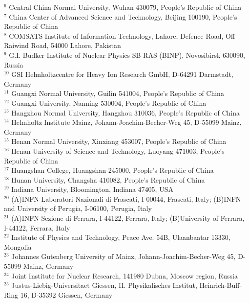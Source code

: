 \begin{small}
\begin{center}
{$^{6}$ Central China Normal University, Wuhan 430079, People's Republic of China\\
$^{7}$ China Center of Advanced Science and Technology, Beijing 100190, People's Republic of China\\
$^{8}$ COMSATS Institute of Information Technology, Lahore, Defence Road, Off Raiwind Road, 54000 Lahore, Pakistan\\
$^{9}$ G.I. Budker Institute of Nuclear Physics SB RAS (BINP), Novosibirsk 630090, Russia\\
$^{10}$ GSI Helmholtzcentre for Heavy Ion Research GmbH, D-64291 Darmstadt, Germany\\
$^{11}$ Guangxi Normal University, Guilin 541004, People's Republic of China\\
$^{12}$ Guangxi University, Nanning 530004, People's Republic of China\\
$^{13}$ Hangzhou Normal University, Hangzhou 310036, People's Republic of China\\
$^{14}$ Helmholtz Institute Mainz, Johann-Joachim-Becher-Weg 45, D-55099 Mainz, Germany\\
$^{15}$ Henan Normal University, Xinxiang 453007, People's Republic of China\\
$^{16}$ Henan University of Science and Technology, Luoyang 471003, People's Republic of China\\
$^{17}$ Huangshan College, Huangshan 245000, People's Republic of China\\
$^{18}$ Hunan University, Changsha 410082, People's Republic of China\\
$^{19}$ Indiana University, Bloomington, Indiana 47405, USA\\
$^{20}$ (A)INFN Laboratori Nazionali di Frascati, I-00044, Frascati, Italy; (B)INFN and University of Perugia, I-06100, Perugia, Italy\\
$^{21}$ (A)INFN Sezione di Ferrara, I-44122, Ferrara, Italy; (B)University of Ferrara, I-44122, Ferrara, Italy\\
$^{22}$ Institute of Physics and Technology, Peace Ave. 54B, Ulaanbaatar 13330, Mongolia\\
$^{23}$ Johannes Gutenberg University of Mainz, Johann-Joachim-Becher-Weg 45, D-55099 Mainz, Germany\\
$^{24}$ Joint Institute for Nuclear Research, 141980 Dubna, Moscow region, Russia\\
$^{25}$ Justus-Liebig-Universitaet Giessen, II. Physikalisches Institut, Heinrich-Buff-Ring 16, D-35392 Giessen, Germany\\
}
\end{center}
\end{small}
